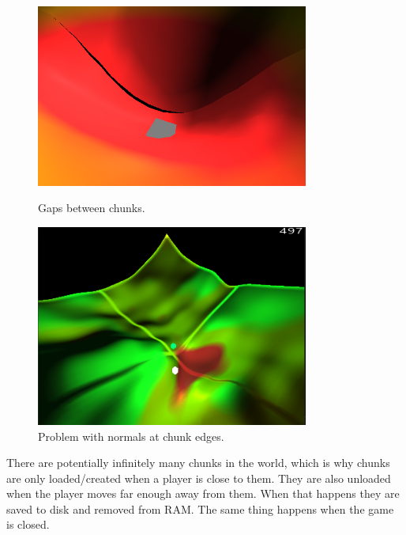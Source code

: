 \begin{figure}[h]
    \centering
    \begin{minipage}{0.45\textwidth}
        \centering
        \includegraphics[width=0.8\textwidth]{chapters/implementation/sections/terrain/resources/chunk_edges_gaps.png}
        \caption{Gaps between chunks.}
        \label{fig:gaps_between_chunks}
    \end{minipage}\hfill
    \begin{minipage}{0.45\textwidth}
        \centering
        \includegraphics[width=0.8\textwidth]{chapters/implementation/sections/terrain/resources/chunk_edges_normals_problem.png}
        \caption{Problem with normals at chunk edges.}
        \label{fig:problem_with_normals_at_chunk_edge}
    \end{minipage}
\end{figure}

There are potentially infinitely many chunks in the world, which is why chunks are only loaded/created when a player is close to them.
They are also unloaded when the player moves far enough away from them.
When that happens they are saved to disk and removed from RAM.
The same thing happens when the game is closed.